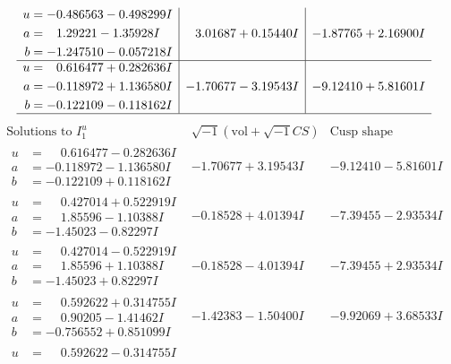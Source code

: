 \documentclass[1p]{elsarticle_modified}
\theoremstyle{definition}
\newcommand{\I}{\sqrt{-1}}
\begin{document}
$$\begin{array}{c|c|c}
\begin{aligned}
u &= -0.486563 - 0.498299 I \\
a &= \phantom{-}1.29221 - 1.35928 I \\
b &= -1.247510 - 0.057218 I\end{aligned}
 & \phantom{-}3.01687 + 0.15440 I & -1.87765 + 2.16900 I \\ \hline\begin{aligned}
u &= \phantom{-}0.616477 + 0.282636 I \\
a &= -0.118972 + 1.136580 I \\
b &= -0.122109 - 0.118162 I\end{aligned}
 & -1.70677 - 3.19543 I & -9.12410 + 5.81601 I\\
 \hline 
 \end{array}$$\newpage$$\begin{array}{c|c|c}  
\text{Solutions to }I^u_{1}& \I (\text{vol} + \sqrt{-1}CS) & \text{Cusp shape}\\
 \hline 
\begin{aligned}
u &= \phantom{-}0.616477 - 0.282636 I \\
a &= -0.118972 - 1.136580 I \\
b &= -0.122109 + 0.118162 I\end{aligned}
 & -1.70677 + 3.19543 I & -9.12410 - 5.81601 I \\ \hline\begin{aligned}
u &= \phantom{-}0.427014 + 0.522919 I \\
a &= \phantom{-}1.85596 - 1.10388 I \\
b &= -1.45023 - 0.82297 I\end{aligned}
 & -0.18528 + 4.01394 I & -7.39455 - 2.93534 I \\ \hline\begin{aligned}
u &= \phantom{-}0.427014 - 0.522919 I \\
a &= \phantom{-}1.85596 + 1.10388 I \\
b &= -1.45023 + 0.82297 I\end{aligned}
 & -0.18528 - 4.01394 I & -7.39455 + 2.93534 I \\ \hline\begin{aligned}
u &= \phantom{-}0.592622 + 0.314755 I \\
a &= \phantom{-}0.90205 - 1.41462 I \\
b &= -0.756552 + 0.851099 I\end{aligned}
 & -1.42383 - 1.50400 I & -9.92069 + 3.68533 I \\ \hline\begin{aligned}
u &= \phantom{-}0.592622 - 0.314755 I \\

\end{aligned}
\end{array}$$
\end{document}
